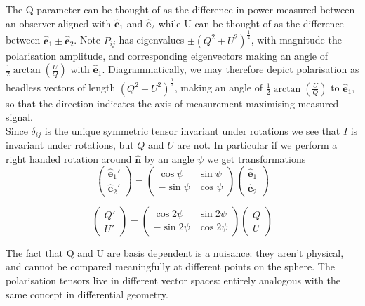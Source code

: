 \documentclass[a4paper,10pt]{article}
\renewcommand{\v}[1]{\mathbf{#1}}
\newcommand{\half}{\frac{1}{2}}
\newcommand{\unit}[1]{\hat{\v{#1}}}
\begin{document}
The Q parameter can be thought of as the difference in power measured between an observer aligned with $\unit{e}_1$ and $\unit{e}_2$ while U can be thought of as the difference between $\unit{e}_1\pm\unit{e}_2$. Note $P_{ij}$ has eigenvalues $\pm (Q^2 + U^2)^\half$, with magnitude the polarisation amplitude, and corresponding eigenvectors making an angle of $\half\arctan(\frac{U}{Q})$ with $\unit{e}_1$. Diagrammatically, we may therefore depict polarisation as headless vectors of length $(Q^2 + U^2)^\half$, making an angle of $\half\arctan(\frac{U}{Q})$ to $\unit{e}_1$, so that the direction indicates the axis of measurement maximising measured signal.\\

Since $\delta_{ij}$ is the unique symmetric tensor invariant under rotations we see that $I$ is invariant under rotations, but $Q$ and $U$ are not. In particular if we perform a right handed rotation around $\unit{n}$ by an angle $\psi$ we get transformations
\begin{equation}
\begin{pmatrix}
\unit{e}_1'\\
\unit{e}_2' 
\end{pmatrix}
=
\begin{pmatrix}
\cos{\psi} & \sin{\psi}\\ 
-\sin{\psi} & \cos{\psi}
\end{pmatrix}
\begin{pmatrix}
\unit{e}_1\\
\unit{e}_2
\end{pmatrix}
\end{equation}


\begin{equation}
\begin{pmatrix}
Q'\\
U' 
\end{pmatrix}
=
\begin{pmatrix}
\cos{2\psi} & \sin{2\psi}\\ 
-\sin{2\psi} & \cos{2\psi}
\end{pmatrix}
\begin{pmatrix}
Q\\
U
\end{pmatrix}
\label{QUtranform}
\end{equation}

The fact that Q and U are basis dependent is a nuisance:  they aren't physical, and cannot be compared meaningfully at different points on the sphere. The polarisation tensors live in different vector spaces: entirely analogous with the same concept in differential geometry. \\
\end{document}
